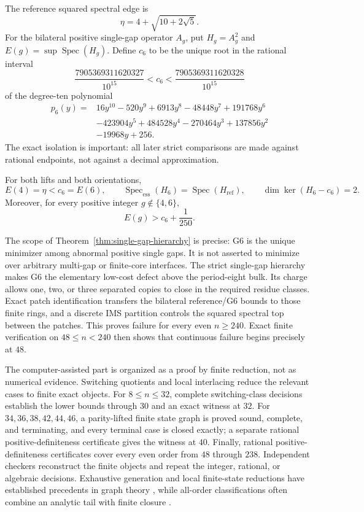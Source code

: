 The reference squared spectral edge is
\[
\eta=4+\sqrt{10+2\sqrt5}.
\]
For the bilateral positive single-gap operator \(A_g\), put \(H_g=A_g^2\)
and \(E(g)=\sup\operatorname{Spec}(H_g)\).  Define \(c_6\) to be the unique
root in the rational interval
\[
\frac{7905369311620327}{10^{15}}<c_6<
\frac{7905369311620328}{10^{15}}
\]
of the degree-ten polynomial
\[
\begin{aligned}
p_6(y)={}&16y^{10}-520y^9+6913y^8-48448y^7+191768y^6\\
&-423904y^5+484528y^4-270464y^3+137856y^2\\
&-19968y+256.
\end{aligned}
\]
The exact isolation is important: all later strict comparisons are made
against rational endpoints, not against a decimal approximation.

\begin{theorem}
\label{thm:single-gap-hierarchy}
For both lifts and both orientations,
\[
E(4)=\eta<c_6=E(6),
\qquad
\operatorname{Spec}_{\mathrm{ess}}(H_6)
=\operatorname{Spec}(H_{\mathrm{ref}}),
\qquad
\dim\ker(H_6-c_6)=2.
\]
Moreover, for every positive integer \(g\notin\{4,6\}\),
\[
E(g)>c_6+\frac1{250}.
\]
\end{theorem}

The scope of Theorem~\ref{thm:single-gap-hierarchy} is precise: G6 is the
unique minimizer among abnormal positive single gaps.  It is not asserted to
minimize over arbitrary multi-gap or finite-core interfaces.  The strict
single-gap hierarchy makes G6 the elementary low-cost defect above the
period-eight bulk.  Its charge allows one, two, or three separated copies to
close in the required residue classes.  Exact patch identification transfers
the bilateral reference/G6 bounds to those finite rings, and a discrete IMS
partition controls the squared spectral top between the patches.  This proves
failure for every even \(n\geq240\).  Exact finite verification on
\(48\leq n<240\) then shows that continuous failure begins precisely at
\(48\).

The computer-assisted part is organized as a proof by finite reduction, not
as numerical evidence.  Switching quotients and local interlacing reduce the
relevant cases to finite exact objects.  For \(8\leq n\leq32\), complete
switching-class decisions establish the lower bounds through \(30\) and an
exact witness at \(32\).  For \(34,36,38,42,44,46\), a parity-lifted finite
state graph is proved sound, complete, and terminating, and every terminal
case is closed exactly; a separate rational positive-definiteness certificate
gives the witness at \(40\).  Finally, rational positive-definiteness
certificates cover every even order from \(48\) through \(238\).  Independent
checkers reconstruct the finite objects and repeat the integer, rational, or
algebraic decisions.  Exhaustive generation and local finite-state reductions
have established precedents in graph theory \cite{GoedgebeurSchaudt2018,DeVosSamal2011},
while all-order classifications often combine an analytic tail with finite
closure \cite{LinNing2021,GoedgebeurRendersWienerZamfirescu2024}.

